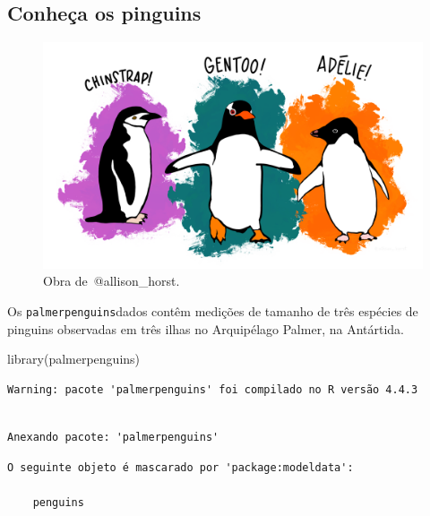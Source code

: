 \documentclass[
  12pt,
  letterpaper,
  DIV=11,
  numbers=noendperiod]{scrreprt}
\newenvironment{Shaded}{\begin{snugshade}}{\end{snugshade}}
\newcommand{\FunctionTok}[1]{\textcolor[rgb]{0.28,0.35,0.67}{#1}}
\newcommand{\NormalTok}[1]{\textcolor[rgb]{0.00,0.23,0.31}{#1}}
\theoremstyle{definition}
\theoremstyle{exemplo}
\begin{document}
\subsection{\texorpdfstring{\textbf{Conheça os pinguins}
🐧}{Conheça os pinguins 🐧}}\label{conheuxe7a-os-pinguins}

\begin{figure}[H]

{\centering \includegraphics{images/clipboard-3055016893.png}

}

\caption{Obra de~@allison\_horst.}

\end{figure}%

Os \texttt{palmerpenguins}dados contêm medições de tamanho de três
espécies de pinguins observadas em três ilhas no Arquipélago Palmer, na
Antártida.

\begin{Shaded}
\begin{Highlighting}[]
\FunctionTok{library}\NormalTok{(palmerpenguins)}
\end{Highlighting}
\end{Shaded}

\begin{verbatim}
Warning: pacote 'palmerpenguins' foi compilado no R versão 4.4.3
\end{verbatim}

\begin{verbatim}

Anexando pacote: 'palmerpenguins'
\end{verbatim}

\begin{verbatim}
O seguinte objeto é mascarado por 'package:modeldata':

    penguins
\end{verbatim}
\end{document}
